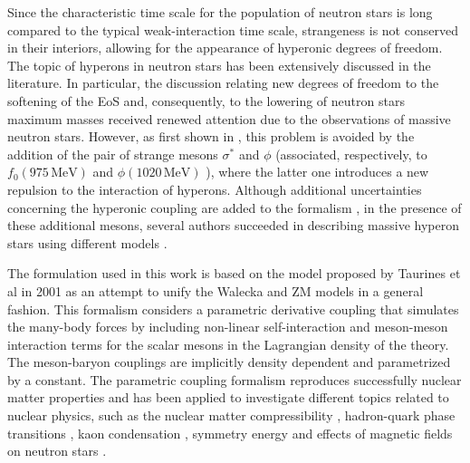 \documentclass[twocolumn,showpacs,aps]{revtex4}
\begin{document}
Since the characteristic time scale for the population of neutron stars is long compared to the typical 
weak-interaction time scale, strangeness is not conserved in their interiors, allowing for the 
appearance of hyperonic degrees of freedom.
The topic of hyperons in neutron stars has been extensively discussed in the literature.
In particular, the discussion relating new degrees of freedom to the softening of the EoS and, consequently, 
to the lowering of neutron stars maximum masses received renewed attention 
\cite{Sahakian1963,Glendenning:1982nc,Glendenning:1984jr,Knorren:1995ds,Hanauske:1999ga,SchaffnerBielich:2002ki} 
due to the observations of massive neutron stars.
However, as first shown in \cite{Schaffner:1995th}, this problem is avoided by the addition
of the pair of strange mesons $\sigma^*$ and $\phi$ (associated, respectively, to $f_0(975\,\mathrm{MeV})$ and $\phi(1020\,\mathrm{MeV})$ \cite{Beringer:1900zz}),
where the latter one introduces a new repulsion to the interaction of hyperons. 
Although additional uncertainties concerning the hyperonic coupling are added to the formalism \cite{Fortin:2014mya},
in the presence of these additional mesons, several authors succeeded in describing massive hyperon stars using different models 
\cite{Dexheimer:2008ax, Bednarek:2011gd, Bonanno:2011ch, Weissenborn:2011ut, Weissenborn:2011kb,  
Lopes:2013cpa, Lastowiecki:2011hh, Bhowmick:2014pma, Banik:2014qja, Gusakov:2014ota, vanDalen:2014mqa, Yamamoto:2014jga}.


The formulation used in this work is based on the model proposed by Taurines et al 
in 2001 \cite{Taurines:2000zb} as an attempt to unify the Walecka and ZM models in a general fashion.
This formalism considers a parametric derivative coupling that simulates the many-body forces by 
including non-linear self-interaction and meson-meson interaction terms for the scalar mesons in the Lagrangian density of the theory.
The meson-baryon couplings are implicitly density dependent and parametrized by a constant.
The parametric coupling formalism reproduces successfully nuclear matter properties and has been
applied to investigate different topics related to nuclear physics, such as the nuclear matter compressibility \cite{Dexheimer:2007mt},
hadron-quark phase transitions \cite{Burigo:2010zz}, kaon condensation \cite{Razeira:2011zz}, symmetry energy \cite{Marranghello:2010wu}
and effects of magnetic fields on neutron stars \cite{Gomes:2014ova,Gomes:2014dka}.
\end{document}
